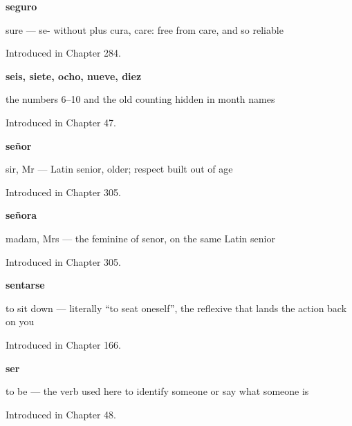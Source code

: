 \noindent\begin{minipage}[t]{\linewidth}
\raggedright
\textbf{seguro}\par
\small sure — se- without plus cura, care: free from care, and so reliable\par
\footnotesize Introduced in Chapter 284.
\end{minipage}\par\medskip

\noindent\begin{minipage}[t]{\linewidth}
\raggedright
\textbf{seis, siete, ocho, nueve, diez}\par
\small the numbers 6–10 and the old counting hidden in month names\par
\footnotesize Introduced in Chapter 47.
\end{minipage}\par\medskip

\noindent\begin{minipage}[t]{\linewidth}
\raggedright
\textbf{señor}\par
\small sir, Mr — Latin senior, older; respect built out of age\par
\footnotesize Introduced in Chapter 305.
\end{minipage}\par\medskip

\noindent\begin{minipage}[t]{\linewidth}
\raggedright
\textbf{señora}\par
\small madam, Mrs — the feminine of senor, on the same Latin senior\par
\footnotesize Introduced in Chapter 305.
\end{minipage}\par\medskip

\noindent\begin{minipage}[t]{\linewidth}
\raggedright
\textbf{sentarse}\par
\small to sit down — literally \textquotedblleft{}to seat oneself\textquotedblright{}, the reflexive that lands the action back on you\par
\footnotesize Introduced in Chapter 166.
\end{minipage}\par\medskip

\noindent\begin{minipage}[t]{\linewidth}
\raggedright
\textbf{ser}\par
\small to be — the verb used here to identify someone or say what someone is\par
\footnotesize Introduced in Chapter 48.
\end{minipage}\par\medskip

